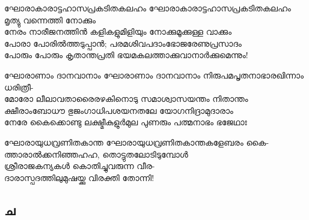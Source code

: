 \begin{enumerate}

\begin{slokam}{\VSr}{\KA}{ഘോരാകാരാട്ടഹാസപ്രകടിതകലഹം}
ഘോരാകാരാട്ടഹാസപ്രകടിതകലഹം മൃത്യു വന്നെത്തി നോക്കും\\
നേരം നാരീജനത്തിൻ കളികളുമിളിയും നോക്കുമൂക്കുള്ള വാക്കും\\
പോരാ പോരിൽത്തടുപ്പാൻ; പരമശിവപദാംഭോജരേണുപ്രസാദം\\
പോരും പോരും കൃതാന്തപ്രതി ഭയമകലത്താക്കുവാനാർക്കുമെന്നും!
\end{slokam}


\begin{slokam}{\VSr}{\Unk}{ഘോരാണാം ദാനവാനാം}
ഘോരാണാം ദാനവാനാം നിരുപമപൃതനാഭാരഖിന്നാം ധരിത്രീ-\\
മോരോ ലീലാവതാരൈരഴകിനൊടു സമാശ്വാസയന്തം നിതാന്തം\\
ക്ഷീരാംബോധൗ ഭുജംഗാധിപശയനതലേ യോഗനിദ്രാമുദാരാം\\
നേരേ കൈക്കൊണ്ടു ലക്ഷ്മീകുളുർമുല പുണരും പത്മനാഭം ഭജേഥാഃ
\end{slokam}


\begin{slokam}{\VVt}{\KA}{ഘോരായുധവ്രണിതകാന്ത}
ഘോരായുധവ്രണിതകാന്തകളേബരം കൈ-\\
ത്താരാൽക്കനിഞ്ഞഹഹ, തൊട്ടുതലോടിടുമ്പോള്‍\\
ശ്രീരാജകന്യകള്‍ കൊതിച്ചുവരുന്ന വീര-\\
ദാരാസ്പദത്തിലുമുഷയ്ക്കു വിരക്തി തോന്നി!
\end{slokam}



\end{enumerate}
\subsection{ച}

